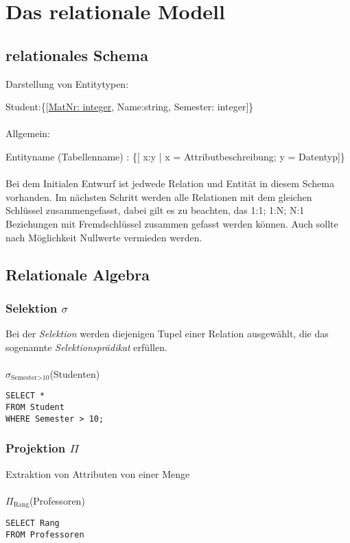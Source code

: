 \chapter{Das relationale Modell}
\section{relationales Schema}
Darstellung von Entitytypen:

Student:\{[\underline{MatNr: integer}, Name:string, Semester: integer]\}\\
\qquad\\
Allgemein:

Entityname (Tabellenname) : \{[ x:y | x = Attributbeschreibung; y = Datentyp]\}\\
\qquad \\
Bei dem Initialen Entwurf ist jedwede Relation und Entität in diesem Schema vorhanden. Im nächsten Schritt werden alle Relationen mit dem gleichen Schlüssel zusammengefasst, dabei gilt es zu beachten, das 1:1; 1:N; N:1 Beziehungen mit Fremdschlüssel zusammen gefasst werden können. Auch sollte nach Möglichkeit Nullwerte vermieden werden. 

\section{Relationale Algebra}
\subsection{Selektion $\sigma$}
Bei der \textit{Selektion} werden diejenigen Tupel einer Relation ausgewählt, die das sogenannte \textit{Selektionsprädikat} erfüllen.\\\qquad\\
$\sigma_{\text{Semester>10}}$(Studenten)
\qquad\\
\begin{lstlisting}
SELECT * 
FROM Student
WHERE Semester > 10; 
\end{lstlisting}


\subsection{Projektion $\Pi$}
Extraktion von Attributen von einer Menge\\
\qquad\\
$\Pi_{\text{Rang}}$(Professoren)\\
\begin{lstlisting}
SELECT Rang
FROM Professoren
\end{lstlisting}


